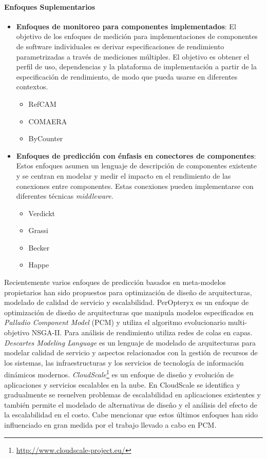 \documentclass[11pt, twoside]{report}
\begin{document}
\paragraph{Enfoques Suplementarios}
\begin{itemize}
    \item \textbf{Enfoques de monitoreo para componentes implementados}: El objetivo de los enfoques de medición para implementaciones de componentes de software individuales es derivar especificaciones de rendimiento parametrizadas a través de mediciones múltiples. El objetivo es obtener el perfil de uso, dependencias y la plataforma de implementación a partir de la especificación de rendimiento, de modo que pueda usarse en diferentes contextos. 
    \begin{itemize}
        \item RefCAM
        \item COMAERA
        \item ByCounter
    \end{itemize}
    \item \textbf{Enfoques de predicción con énfasis en conectores de componentes}: Estos enfoques asumen un lenguaje de descripción de componentes existente y se centran en modelar y medir el impacto en el rendimiento de las conexiones entre componentes. Estas conexiones pueden implementarse con diferentes técnicas \emph{middleware}.
    \begin{itemize}
        \item Verdickt
        \item Grassi
        \item Becker
        \item Happe
    \end{itemize}        
\end{itemize}

Recientemente varios enfoques de predicción basados en meta-modelos propietarios han sido propuestos para optimización de diseño de arquitecturas, modelado de calidad de servicio y escalabilidad. PerOpteryx\cite{peropteryx} es un enfoque de optimización de diseño de arquitecturas que manipula modelos especificados en \emph{Palladio Component Model} (PCM)\cite{palladio-blue-book} y utiliza el algoritmo evolucionario multi-objetivo NSGA-II. Para análisis de rendimiento utiliza redes de colas en capas. \emph{Descartes Modeling Language}\cite{descartesml} es un lenguaje de modelado de arquitecturas para modelar calidad de servicio y aspectos relacionados con la gestión de recursos de los sistemas, las infraestructuras y los servicios de tecnología de información dinámicos modernos. \emph{CloudScale}\footnote{\url{http://www.cloudscale-project.eu/}}\cite{cloudscale} es un enfoque de diseño y evolución de aplicaciones y servicios escalables en la nube. En CloudScale se identifica y gradualmente se resuelven problemas de escalabilidad en aplicaciones existentes y también permite el modelado de alternativas de diseño y el análisis del efecto de la escalabilidad en el costo. Cabe mencionar que estos últimos enfoques han sido influenciado en gran medida por el trabajo llevado a cabo en PCM.
\end{document}
